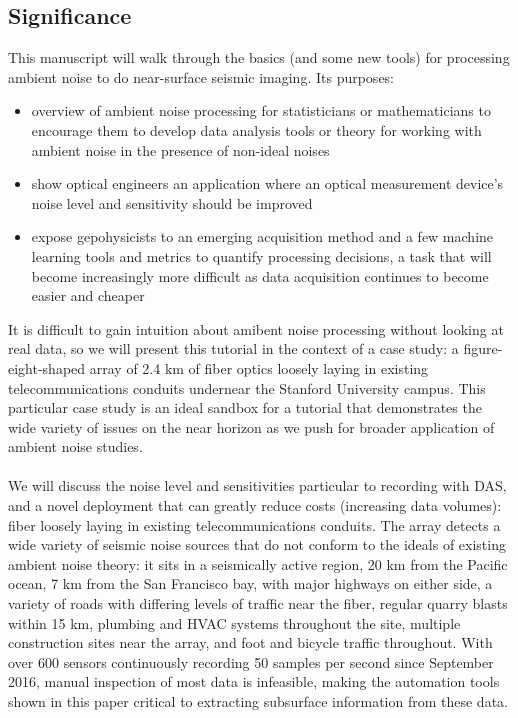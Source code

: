 \documentclass[11pt]{article}
\begin{document}
\vspace{-0.3cm}
\subsection*{Significance} 
\vspace{-0.2cm}
This manuscript will walk through the basics (and some new tools) for processing ambient noise to do near-surface seismic imaging. Its purposes:
\vspace{-0.2cm}
\begin{itemize}
\item overview of ambient noise processing for statisticians or mathematicians to encourage them to develop data analysis tools or theory for working with ambient noise in the presence of non-ideal noises
\vspace{-0.2cm}
\item show optical engineers an application where an optical measurement device's noise level and sensitivity should be improved
\vspace{-0.2cm}
\item expose gepohysicists to an emerging acquisition method and a few machine learning tools and metrics to quantify processing decisions, a task that will become increasingly more difficult as data acquisition continues to become easier and cheaper
\end{itemize}
\vspace{-0.2cm}
It is difficult to gain intuition about amibent noise processing without looking at real data, so we will present this tutorial in the context of a case study: a figure-eight-shaped array of 2.4 km of fiber optics loosely laying in existing telecommunications conduits undernear the Stanford University campus. This particular case study is an ideal sandbox for a tutorial that demonstrates the wide variety of issues on the near horizon as we push for broader application of ambient noise studies. 
\\
\\
We will discuss the noise level and sensitivities particular to recording with DAS, and a novel deployment that can greatly reduce costs (increasing data volumes): fiber loosely laying in existing telecommunications conduits. The array detects a wide variety of seismic noise sources that do not conform to the ideals of existing ambient noise theory: it sits in a seismically active region, 20 km from the Pacific ocean, 7 km from the San Francisco bay, with major highways on either side, a variety of roads with differing levels of traffic near the fiber, regular quarry blasts within 15 km, plumbing and HVAC systems throughout the site, multiple construction sites near the array, and foot and bicycle traffic throughout. With over 600 sensors continuously recording 50 samples per second since September 2016, manual inspection of most data is infeasible, making the automation tools shown in this paper critical to extracting subsurface information from these data.
\end{document}
